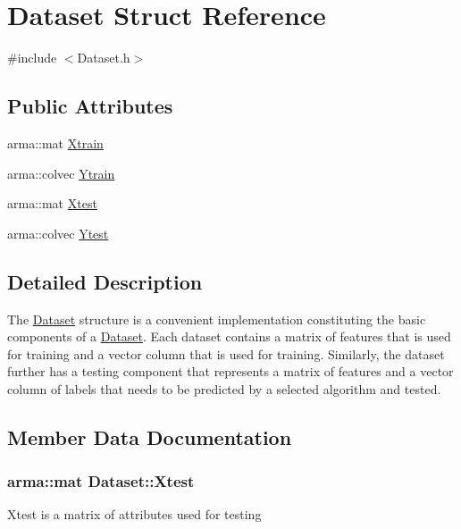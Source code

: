 \hypertarget{structDataset}{}\section{Dataset Struct Reference}
\label{structDataset}


{\ttfamily \#include $<$Dataset.\+h$>$}

\subsection*{Public Attributes}
\begin{DoxyCompactItemize}
\item 
arma\+::mat \hyperlink{structDataset_afba2ca3372581ba850149b0a806e15c4}{Xtrain}
\item 
arma\+::colvec \hyperlink{structDataset_ac8226522f944e7f586c9ead2240c8a6b}{Ytrain}
\item 
arma\+::mat \hyperlink{structDataset_ae013d9631db39109264e1f39adc616e0}{Xtest}
\item 
arma\+::colvec \hyperlink{structDataset_a3b08f5de87d947b3f974d8534048e6be}{Ytest}
\end{DoxyCompactItemize}


\subsection{Detailed Description}
The \hyperlink{structDataset}{Dataset} structure is a convenient implementation constituting the basic components of a \hyperlink{structDataset}{Dataset}. Each dataset contains a matrix of features that is used for training and a vector column that is used for training. Similarly, the dataset further has a testing component that represents a matrix of features and a vector column of labels that needs to be predicted by a selected algorithm and tested. 

\subsection{Member Data Documentation}
\subsubsection[{\texorpdfstring{Xtest}{Xtest}}]{\setlength{\rightskip}{0pt plus 5cm}arma\+::mat Dataset\+::\+Xtest}\hypertarget{structDataset_ae013d9631db39109264e1f39adc616e0}{}\label{structDataset_ae013d9631db39109264e1f39adc616e0}
Xtest is a matrix of attributes used for testing 
